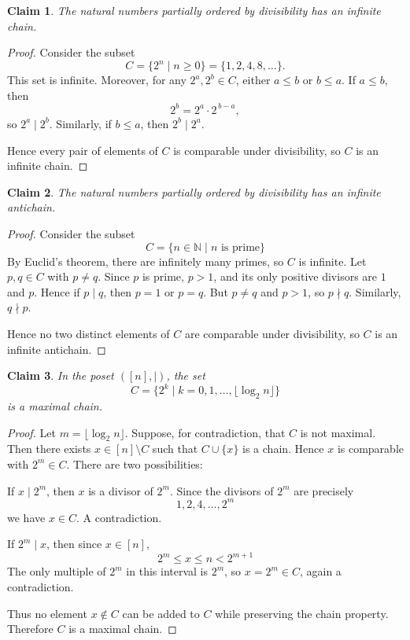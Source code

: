 \documentclass{article}
\newtheorem{claim}{Claim}
\begin{document}
\begin{claim}
    The natural numbers partially ordered by divisibility has an infinite chain.
\end{claim}

\begin{proof}
    Consider the subset
    \[
        C = \{2^n \mid n \ge 0\}
        = \{1,2,4,8,\dots\}.
    \]
    This set is infinite. Moreover, for any $2^a,2^b \in C$, either $a \le b$ or 
    $b \le a$. If $a \le b$, then
    \[
        2^b = 2^a \cdot 2^{\,b-a},
    \]
    so $2^a \mid 2^b$. Similarly, if $b \le a$, then $2^b \mid 2^a$.

    \medskip
    
    Hence every pair of elements of $C$ is comparable under divisibility, so $C$ is 
    an infinite chain.
\end{proof}

\begin{claim}
    The natural numbers partially ordered by divisibility has an infinite antichain.
\end{claim}

\begin{proof}
    Consider the subset
    \[
        C = \{ n \in \mathbb{N} \mid \text{$n$ is prime} \}
    \]
    By Euclid's theorem, there are infinitely many primes, so $C$ is infinite.
    Let $p,q \in C$ with $p \neq q$. Since $p$ is prime, $p > 1$, and its only 
    positive divisors are $1$ and $p$. Hence if $p \mid q$, then $p = 1$ or 
    $p = q$. But $p \neq q$ and $p > 1$, so $p \nmid q$. Similarly, $q \nmid p$.

    \medskip

    Hence no two distinct elements of $C$ are comparable under divisibility, so 
    $C$ is an infinite antichain.
\end{proof}

\begin{claim}
    In the poset $([n], \mid)$, the set
    \[
    C = \{ 2^k \mid k = 0,1,\dots,\lfloor \log_2 n \rfloor \}
    \]
    is a maximal chain.
\end{claim}

\begin{proof}
    Let $m = \lfloor\log_2 n\rfloor$. Suppose, for contradiction, that $C$ is not 
    maximal. Then there exists $x \in [n] \setminus C$ such that $C \cup \{x\}$ is 
    a chain. Hence $x$ is comparable with $2^m \in C$. There are two possibilities:

    \medskip

    If $x \mid 2^m$, then $x$ is a divisor of $2^m$. Since the divisors of $2^m$ 
    are precisely 
    \[
    1, 2, 4, \dots, 2^m
    \]
    we have $x \in C$. A contradiction.

    \medskip

    If $2^m \mid x$, then since $x \in [n]$, 
    \[
    2^m \leq x \leq n < 2^{m+1}
    \]
    The only multiple of $2^m$ in this interval is $2^m$, so $x = 2^m \in C$, 
    again a contradiction.

    \medskip

    Thus no element $x \notin C$ can be added to $C$ while preserving the chain 
    property. Therefore $C$ is a maximal chain.
\end{proof}
\end{document}
